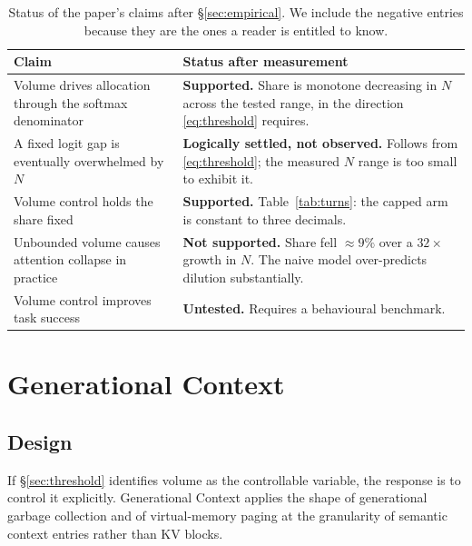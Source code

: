 \documentclass[11pt,a4paper]{article}
\theoremstyle{plain}
\theoremstyle{definition}
\theoremstyle{remark}
\begin{document}
\begin{table}[ht]
\centering
\small
\begin{tabular}{p{}p{}}
\toprule
\textbf{Claim} & \textbf{Status after measurement} \\
\midrule
Volume drives allocation through the softmax denominator &
\textbf{Supported.} Share is monotone decreasing in $N$ across the tested range, in the direction \eqref{eq:threshold} requires. \\
\addlinespace
A fixed logit gap is eventually overwhelmed by $N$ &
\textbf{Logically settled, not observed.} Follows from \eqref{eq:threshold}; the measured $N$ range is too small to exhibit it. \\
\addlinespace
Volume control holds the share fixed &
\textbf{Supported.} Table~\ref{tab:turns}: the capped arm is constant to three decimals. \\
\addlinespace
Unbounded volume causes attention collapse in practice &
\textbf{Not supported.} Share fell $\approx 9\%$ over a $32\times$ growth in $N$. The naive model over-predicts dilution substantially. \\
\addlinespace
Volume control improves task success &
\textbf{Untested.} Requires a behavioural benchmark. \\
\bottomrule
\end{tabular}
\caption{Status of the paper's claims after \S\ref{sec:empirical}. We include
the negative entries because they are the ones a reader is entitled to know.}
\label{tab:claims}
\end{table}

\section{Generational Context}
\label{sec:gc}

\subsection{Design}

If \S\ref{sec:threshold} identifies volume as the controllable variable, the
response is to control it explicitly. Generational Context applies the shape of
generational garbage collection and of virtual-memory paging at the granularity
of semantic context entries rather than KV blocks.
\end{document}
